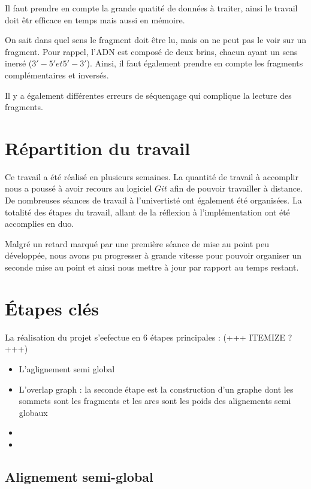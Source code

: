 \documentclass{article}
\begin{document}
Il faut prendre en compte la grande quatité de données à traiter, ainsi le travail doit êtr efficace en temps mais aussi en mémoire.

On sait dans quel sens le fragment doit être lu, mais on ne peut pas le voir sur un fragment. Pour rappel, l'ADN est composé de deux brins, chacun ayant un sens inersé ($ 3' - 5' et 5' -3'$). Ainsi, il faut également prendre en compte les fragments complémentaires et inversés.

Il y a également différentes erreurs de séquençage qui complique la lecture des fragments.

\section{Répartition du travail}


Ce travail a été réalisé en plusieurs semaines. La quantité de travail à accomplir nous a poussé à avoir recours au logiciel $Git$ afin de pouvoir travailler à distance. De nombreuses séances de travail à l'univertisté ont également été organisées. La totalité des étapes du travail, allant de la réflexion à l'implémentation ont été accomplies en duo.

Malgré un retard marqué par une première séance de mise au point peu développée, nous avons pu progresser à grande vitesse pour pouvoir organiser un seconde mise au point et ainsi nous mettre à jour par rapport au temps restant.

\newpage

\section{\'Etapes clés}

La réalisation du projet s'eefectue en 6 étapes principales : (+++ ITEMIZE ?+++)

\begin{itemize}
\item L'aglignement semi global
\item L'overlap graph : la seconde étape est la construction d'un graphe dont les sommets sont les fragments et les arcs sont les poids des alignements semi globaux
\item 
\item 
\end{itemize}


\subsection{Alignement semi-global}
\end{document}
